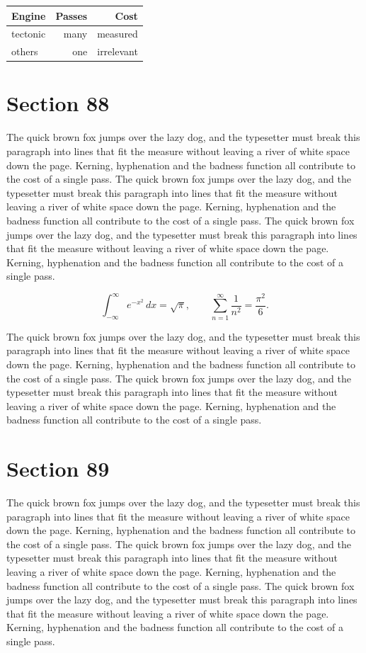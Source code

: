 \documentclass{article}
\begin{document}
\begin{center}
\begin{tabular}{lrr}
\toprule
Engine & Passes & Cost \\
\midrule
tectonic & many & measured \\
others & one & irrelevant \\
\bottomrule
\end{tabular}
\end{center}

\section{Section 88}
The quick brown fox jumps over the lazy dog, and the typesetter must break this paragraph into lines that fit the measure without leaving a river of white space down the page. Kerning, hyphenation and the badness function all contribute to the cost of a single pass. The quick brown fox jumps over the lazy dog, and the typesetter must break this paragraph into lines that fit the measure without leaving a river of white space down the page. Kerning, hyphenation and the badness function all contribute to the cost of a single pass. The quick brown fox jumps over the lazy dog, and the typesetter must break this paragraph into lines that fit the measure without leaving a river of white space down the page. Kerning, hyphenation and the badness function all contribute to the cost of a single pass. 

\begin{equation}
\int_{-\infty}^{\infty} e^{-x^{2}}\,dx = \sqrt{\pi}, \qquad
\sum_{n=1}^{\infty} \frac{1}{n^{2}} = \frac{\pi^{2}}{6}.
\end{equation}

The quick brown fox jumps over the lazy dog, and the typesetter must break this paragraph into lines that fit the measure without leaving a river of white space down the page. Kerning, hyphenation and the badness function all contribute to the cost of a single pass. The quick brown fox jumps over the lazy dog, and the typesetter must break this paragraph into lines that fit the measure without leaving a river of white space down the page. Kerning, hyphenation and the badness function all contribute to the cost of a single pass. 
\section{Section 89}
The quick brown fox jumps over the lazy dog, and the typesetter must break this paragraph into lines that fit the measure without leaving a river of white space down the page. Kerning, hyphenation and the badness function all contribute to the cost of a single pass. The quick brown fox jumps over the lazy dog, and the typesetter must break this paragraph into lines that fit the measure without leaving a river of white space down the page. Kerning, hyphenation and the badness function all contribute to the cost of a single pass. The quick brown fox jumps over the lazy dog, and the typesetter must break this paragraph into lines that fit the measure without leaving a river of white space down the page. Kerning, hyphenation and the badness function all contribute to the cost of a single pass. 
\end{document}
